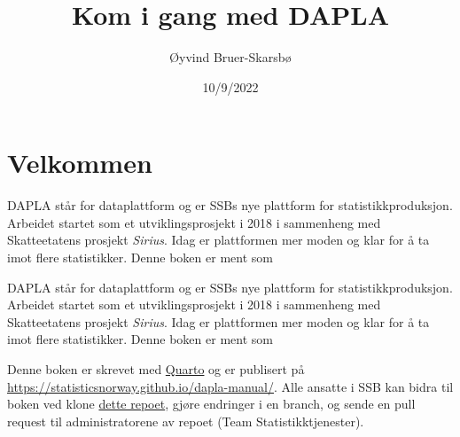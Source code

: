 \documentclass[
  letterpaper,
  DIV=11,
  numbers=noendperiod]{scrreprt}
\title{Kom i gang med DAPLA}
\author{Øyvind Bruer-Skarsbø}
\date{10/9/2022}
\renewcommand*\contentsname{Table of contents}
\newcommand\contentsname{Table of contents}
\begin{document}
\maketitle
\ifdefined\Shaded\renewenvironment{Shaded}{\begin{tcolorbox}[interior hidden, boxrule=0pt, frame hidden, enhanced, borderline west={3pt}{0pt}{shadecolor}, sharp corners, breakable]}{\end{tcolorbox}}\fi

\renewcommand*\contentsname{Innhold}
{
\hypersetup{linkcolor=}
\setcounter{tocdepth}{2}
\tableofcontents
}

\hypertarget{velkommen}{%
\chapter*{Velkommen}\label{velkommen}}

DAPLA står for dataplattform og er SSBs nye plattform for
statistikkproduksjon. Arbeidet startet som et utviklingsprosjekt i 2018
i sammenheng med Skatteetatens prosjekt \emph{Sirius}. Idag er
plattformen mer moden og klar for å ta imot flere statistikker. Denne
boken er ment som

DAPLA står for dataplattform og er SSBs nye plattform for
statistikkproduksjon. Arbeidet startet som et utviklingsprosjekt i 2018
i sammenheng med Skatteetatens prosjekt \emph{Sirius}. Idag er
plattformen mer moden og klar for å ta imot flere statistikker. Denne
boken er ment som

\begin{tcolorbox}[enhanced jigsaw, colback=white, rightrule=.15mm, opacityback=0, bottomrule=.15mm, leftrule=.75mm, arc=.35mm, toprule=.15mm, colframe=quarto-callout-note-color-frame, left=2mm, breakable]
\begin{minipage}[t]{5.5mm}
\textcolor{quarto-callout-note-color}{\faInfo}
\end{minipage}%
\begin{minipage}[t]{\textwidth - 5.5mm}
Denne boken er skrevet med \href{https://quarto.org/}{Quarto} og er
publisert på \url{https://statisticsnorway.github.io/dapla-manual/}.
Alle ansatte i SSB kan bidra til boken ved klone
\href{https://github.com/statisticsnorway/dapla-manual}{dette repoet},
gjøre endringer i en branch, og sende en pull request til
administratorene av repoet (Team Statistikktjenester).\end{minipage}%
\end{tcolorbox}
\end{document}
